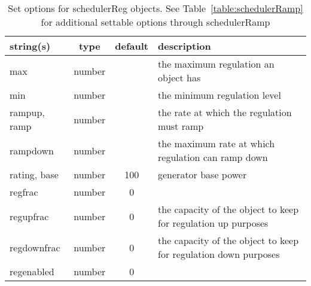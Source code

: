 \begin{table}[ht]
\centering
\begin{tabular}{p{5cm} c c p{7cm}}
\hline
string(s) & type & default & description \\
\hline
max & number &  & the maximum regulation an object has\\
min & number &  & the minimum regulation level\\
rampup, ramp & number &  & the rate at which the regulation must ramp\\
rampdown & number &  & the maximum rate at which regulation can ramp down\\
rating, base & number & 100 & generator base power\\
regfrac & number & 0 & \\
regupfrac & number & 0 & the capacity of the object to keep for regulation up purposes\\
regdownfrac & number & 0 & the capacity of the object to keep for regulation down purposes\\
regenabled & number & 0 & \\
\hline
\end{tabular}
\caption{Set options for schedulerReg objects. See Table~\ref{table:schedulerRamp} for additional settable options through schedulerRamp}
\label{table:schedulerReg}
\end{table}

